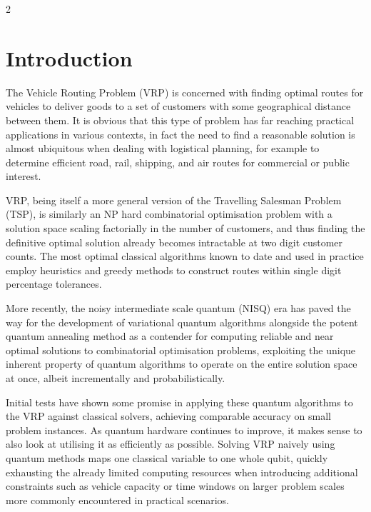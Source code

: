 \documentclass [10pt]{article}
\begin{document}
\begin {multicols}{2}

%

\section {Introduction}
The Vehicle Routing Problem (VRP) is concerned with finding optimal routes
for vehicles to deliver goods to a set of customers with some geographical
distance between them. It is obvious that this type of problem has far
reaching practical applications in various contexts, in fact the need to find
a reasonable solution is almost ubiquitous when dealing with logistical
planning, for example to determine efficient road, rail, shipping, and air
routes for commercial or public interest.

VRP, being itself a more general version of the Travelling Salesman Problem
(TSP), is similarly an NP hard combinatorial optimisation problem with a
solution space scaling factorially in the number of customers, and thus
finding the definitive optimal solution already becomes intractable at
two digit customer counts. The most optimal classical algorithms known to date
and used in practice employ heuristics and greedy methods to construct routes
within single digit percentage tolerances.

More recently, the noisy intermediate scale quantum (NISQ) era has paved
the way for the development of variational quantum algorithms alongside the
potent quantum annealing method as a contender for computing reliable and
near optimal solutions to combinatorial optimisation problems, exploiting
the unique inherent property of quantum algorithms to operate on the
entire solution space at once, albeit incrementally and probabilistically.

Initial tests have shown some promise in applying these quantum algorithms
to the VRP against classical solvers, achieving comparable accuracy on
small problem instances. As quantum hardware continues to improve, it makes
sense to also look at utilising it as efficiently as possible. Solving VRP
naively using quantum methods maps one classical variable to one whole qubit,
quickly exhausting the already limited computing resources when introducing
additional constraints such as vehicle capacity or time windows on larger
problem scales more commonly encountered in practical scenarios.


\end{multicols}
\end{document}
